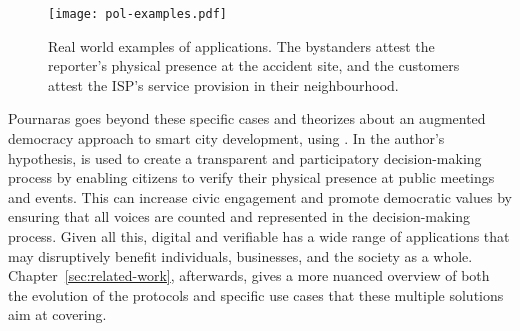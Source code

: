 \begin{figure}[h!]
    \begin{center}
    \texttt{[image: pol-examples.pdf]}
    \caption{Real world examples of \pol{} applications. The bystanders attest the reporter's physical presence at the accident site, and the customers attest the ISP's service provision in their neighbourhood.}
    \label{fig:proof-of-location-example-scenarios}
    \end{center}
\end{figure}

Pournaras \cite{pournaras2020proof} goes beyond these specific cases and theorizes about an augmented democracy approach to smart city development, using \pol{}. In the author's hypothesis, \pol{} is used to create a transparent and participatory decision-making process by enabling citizens to verify their physical presence at public meetings and events. This can increase civic engagement and promote democratic values by ensuring that all voices are counted and represented in the decision-making process. Given all this, digital and verifiable \pol{} has a wide range of applications that may disruptively benefit individuals, businesses, and the society as a whole. Chapter~\ref{sec:related-work}, afterwards, gives a more nuanced overview of both the evolution of the protocols and specific use cases that these multiple solutions aim at covering.